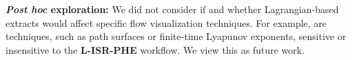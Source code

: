 \noindent
\textbf{\textit{Post hoc} exploration:} We did not consider if and whether Lagrangian-based extracts 
would affect specific flow visualization techniques.
%
For example, are techniques, such as path
surfaces or finite-time Lyapunov exponents, sensitive or insensitive
to the \textbf{L-ISR-PHE} workflow.  
We view this as future work.

%
%
%
%
%


